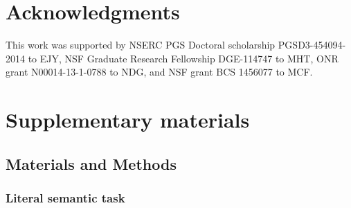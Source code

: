 \documentclass[12pt]{article}
\newcommand{\ejy}[1]{\textcolor{Red}{[ejy: #1]}}
\begin{document}










\section*{Acknowledgments}
This work was supported by NSERC PGS Doctoral scholarship PGSD3-454094-2014 to EJY, NSF Graduate Research Fellowship DGE-114747 to MHT, ONR grant N00014-13-1-0788 to NDG, and NSF grant BCS 1456077 to MCF.


\section*{Supplementary materials}


\subsection*{Materials and Methods}

\subsubsection*{Literal semantic task}
\end{document}
